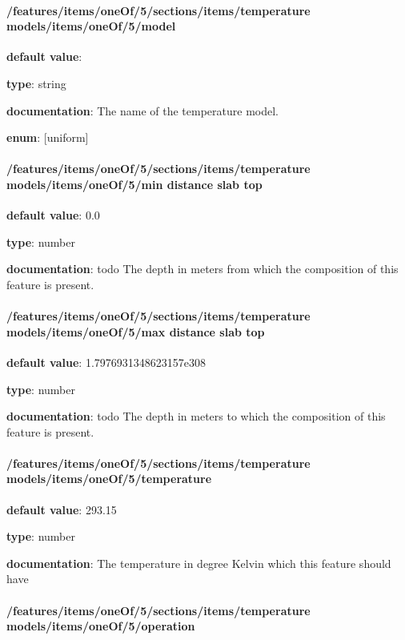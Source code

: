 \paragraph{/features/items/oneOf/5/sections/items/temperature models/items/oneOf/5/model} \begin{itemized}
\item {\bf default value}: 
\item {\bf type}: string
\item {\bf documentation}: The name of the temperature model.
\item {\bf enum}: [uniform]\end{itemized}\paragraph{/features/items/oneOf/5/sections/items/temperature models/items/oneOf/5/min distance slab top} \begin{itemized}
\item {\bf default value}: 0.0
\item {\bf type}: number
\item {\bf documentation}: todo The depth in meters from which the composition of this feature is present.
\end{itemized}\paragraph{/features/items/oneOf/5/sections/items/temperature models/items/oneOf/5/max distance slab top} \begin{itemized}
\item {\bf default value}: 1.7976931348623157e308
\item {\bf type}: number
\item {\bf documentation}: todo The depth in meters to which the composition of this feature is present.
\end{itemized}\paragraph{/features/items/oneOf/5/sections/items/temperature models/items/oneOf/5/temperature} \begin{itemized}
\item {\bf default value}: 293.15
\item {\bf type}: number
\item {\bf documentation}: The temperature in degree Kelvin which this feature should have
\end{itemized}\paragraph{/features/items/oneOf/5/sections/items/temperature models/items/oneOf/5/operation} \begin{itemized}

\end{itemized}
